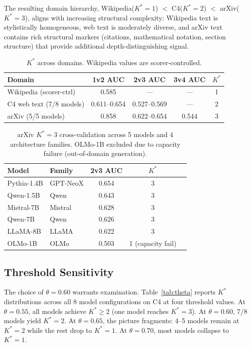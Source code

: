 \documentclass[11pt]{article}
\begin{document}
The resulting domain hierarchy, Wikipedia($K^*{=}1$) $<$ C4($K^*{=}2$) $<$ arXiv($K^*{=}3$), aligns with increasing structural complexity: Wikipedia text is stylistically homogeneous, web text is moderately diverse, and arXiv text contains rich structural markers (citations, mathematical notation, section structure) that provide additional depth-distinguishing signal.

\begin{table}[t]
\centering
\caption{$K^*$ across domains. Wikipedia values are scorer-controlled.}
\label{tab:domain}
\small
\begin{tabular}{lcccc}
\toprule
Domain & 1v2 AUC & 2v3 AUC & 3v4 AUC & $K^*$ \\
\midrule
Wikipedia (scorer-ctrl) & 0.585 & --- & --- & 1 \\
C4 web text (7/8 models) & 0.611--0.654 & 0.527--0.569 & --- & 2 \\
arXiv (5/5 models) & 0.858 & 0.622--0.654 & 0.544 & 3 \\
\bottomrule
\end{tabular}
\end{table}

\begin{table}[t]
\centering
\caption{arXiv $K^*{=}3$ cross-validation across 5 models and 4 architecture families. OLMo-1B excluded due to capacity failure (out-of-domain generation).}
\label{tab:arxiv_cross}
\small
\begin{tabular}{llccc}
\toprule
Model & Family & 2v3 AUC & $K^*$ \\
\midrule
Pythia-1.4B & GPT-NeoX & 0.654 & 3 \\
Qwen-1.5B & Qwen & 0.643 & 3 \\
Mistral-7B & Mistral & 0.628 & 3 \\
Qwen-7B & Qwen & 0.626 & 3 \\
LLaMA-8B & LLaMA & 0.622 & 3 \\
\midrule
OLMo-1B & OLMo & 0.503 & 1 (capacity fail) \\
\bottomrule
\end{tabular}
\end{table}

\subsection{Threshold Sensitivity}
\label{sec:sensitivity}

The choice of $\theta = 0.60$ warrants examination. Table~\ref{tab:theta} reports $K^*$ distributions across all 8 model configurations on C4 at four threshold values. At $\theta = 0.55$, all models achieve $K^* \geq 2$ (one model reaches $K^* = 3$). At $\theta = 0.60$, 7/8 models yield $K^* = 2$. At $\theta = 0.65$, the picture fragments: 4--5 models remain at $K^* = 2$ while the rest drop to $K^* = 1$. At $\theta = 0.70$, most models collapse to $K^* = 1$.
\end{document}
